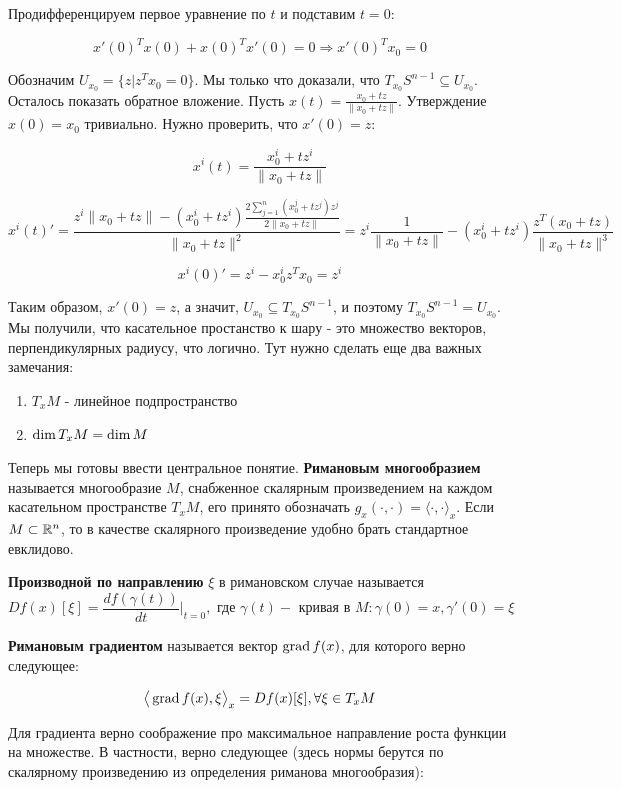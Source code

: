\noindent
Продифференцируем первое уравнение по $t$ и подставим $t=0$:

$$
x'(0)^T x(0) + x(0)^T x'(0) = 0 \Rightarrow x'(0)^T x_0 = 0
$$

\noindent
Обозначим $U_{x_0} = \{z | z^T x_0 = 0\}$. Мы только что доказали, что $T_{x_0} S^{n-1} \subseteq U_{x_0}$. Осталось показать обратное вложение. Пусть $x(t) = \frac{x_0 + tz}{\|x_0 + tz\|}$. Утверждение $x(0) = x_0$ тривиально. Нужно проверить, что $x'(0) = z$:

$$
x^i(t) = \frac{x_0^i + tz^i}{\|x_0 + tz\|}
$$

$$
x^i(t)' = \frac{z^i \|x_0 + tz\| - (x_0^i + tz^i) \frac{2\sum_{j=1}^n (x_0^j + t z^j)z^j}{2\|x_0 + tz\|}}{\|x_0 + tz\|^2} = z^i \frac{1}{\|x_0 + tz\|} - (x_0^i + tz^i) \frac{z^T (x_0 + tz)}{\|x_0 + tz\|^3}
$$

$$
x^i(0)' = z^i - x_0^i z^T x_0 = z^i
$$

\noindent
Таким образом, $x'(0) = z$, а значит, $U_{x_0} \subseteq T_{x_0} S^{n-1}$, и поэтому $T_{x_0} S^{n-1} = U_{x_0}$. Мы получили, что касательное простанство к шару - это множество векторов, перпендикулярных радиусу, что логично. Тут нужно сделать еще два важных замечания:

\begin{enumerate}
    \item $T_x M$ - линейное подпространство
    \item $\operatorname{dim} T_x M = \operatorname{dim} M$
\end{enumerate}

Теперь мы готовы ввести центральное понятие. \textbf{Римановым многообразием} называется многообразие $M$, снабженное скалярным произведением на каждом касательном пространстве $T_x M$, его принято обозначать $g_x(\cdot, \cdot) = \langle \cdot, \cdot \rangle_x$. Если $M \subset \mathbb{R}^n$, то в качестве скалярного произведение удобно брать стандартное евклидово.

\textbf{Производной по направлению} $\xi$ в римановском случае называется
$$
D f(x) [\xi] = \frac{df(\gamma(t))}{dt} \bigg|_{t = 0}, \text{ где } \gamma(t) - \text{ кривая в } M: \gamma(0) = x, \gamma'(0) = \xi
$$

\textbf{Римановым градиентом} называется вектор $\operatorname{grad} f(x)$, для которого верно следующее:

$$
\big\langle \operatorname{grad} f(x), \xi \big\rangle_x = D f(x) [\xi], \forall \xi \in T_x M
$$

\noindent
Для градиента верно соображение про максимальное направление роста функции на множестве. В частности, верно следующее (здесь нормы берутся по скалярному произведению из определения риманова многообразия):

